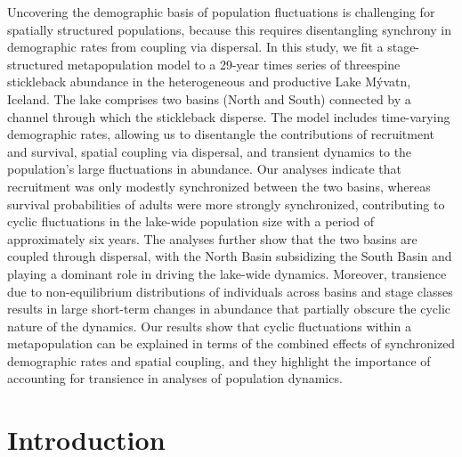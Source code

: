 \documentclass[11pt]{article}
\begin{document}
Uncovering the demographic basis of population fluctuations is challenging 
for spatially structured populations, 
because this requires disentangling synchrony in demographic rates 
from coupling via dispersal. 
In this study, we fit a stage-structured metapopulation model to a 29-year times series 
of threespine stickleback abundance in the heterogeneous 
and productive Lake M\'{y}vatn, Iceland. 
The lake comprises two basins (North and South) connected by a channel 
through which the stickleback disperse. 
The model includes time-varying demographic rates, 
allowing us to disentangle the contributions of recruitment and survival, 
spatial coupling via dispersal, and transient dynamics 
to the population’s large fluctuations in abundance. 
Our analyses indicate that recruitment was only modestly synchronized between the two basins, 
whereas survival probabilities of adults were more strongly synchronized, 
contributing to cyclic fluctuations in the lake-wide population size 
with a period of approximately six years. 
The analyses further show that the two basins are coupled through dispersal, 
with the North Basin subsidizing the South Basin and playing a dominant role 
in driving the lake-wide dynamics. 
Moreover, transience due to non-equilibrium distributions of individuals 
across basins and stage classes results in large short-term changes in abundance 
that partially obscure the cyclic nature of the dynamics. 
Our results show that cyclic fluctuations within a metapopulation 
can be explained in terms of the combined effects 
of synchronized demographic rates and spatial coupling, 
and they highlight the importance 
of accounting for transience in analyses of population dynamics.





\newpage{}

\section*{Introduction} \label{introduction}
\end{document}
